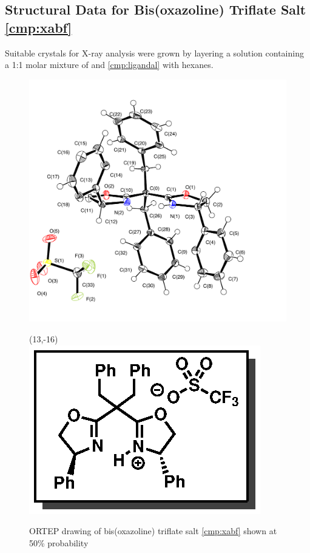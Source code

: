 \pagebreak

\subsection{Structural Data for Bis(oxazoline) Triflate Salt \ref{cmp:xabf}}
Suitable crystals for X-ray analysis were grown by layering a  solution containing a 1:1
molar mixture of  and \ref{cmp:ligandal} with hexanes.
\begin{figure}[h]
  \includegraphics[width=6in]{chp_asymmetric/images/xray/xabf_labelled}
    \begin{textblock}{1}(13,-16)
\includegraphics[scale=0.8]{chp_asymmetric/images/xabf}
\end{textblock}
  \caption{ORTEP drawing of bis(oxazoline) triflate salt \ref{cmp:xabf} shown at 50\% probability }
\end{figure}

